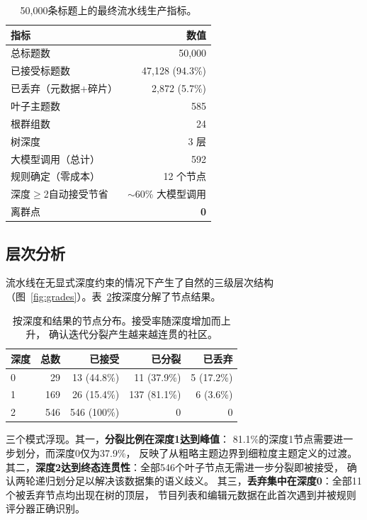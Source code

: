 \documentclass[10pt,twocolumn,twoside]{ctexart}
\begin{document}
\begin{table}[h]
\centering
\caption{50,000条标题上的最终流水线生产指标。}
\label{tab:production}
\small
\begin{tabular}{lr}
\toprule
指标 & 数值 \\
\midrule
总标题数 & 50,000 \\
已接受标题数 & 47,128 (94.3\%) \\
已丢弃（元数据+碎片） & 2,872 (5.7\%) \\
叶子主题数 & 585 \\
根群组数 & 24 \\
树深度 & 3 层 \\
大模型调用（总计） & 592 \\
规则确定（零成本） & 12 个节点 \\
深度$\geq$2自动接受节省 & $\sim$60\% 大模型调用 \\
离群点 & \textbf{0} \\
\bottomrule
\end{tabular}
\end{table}

\subsection{层次分析}
流水线在无显式深度约束的情况下产生了自然的三级层次结构
（图~\ref{fig:grades}）。表~\ref{tab:hierarchy}按深度分解了节点结果。

\begin{table}[h]
\centering
\caption{按深度和结果的节点分布。接受率随深度增加而上升，
确认迭代分裂产生越来越连贯的社区。}
\label{tab:hierarchy}
\small
\begin{tabular}{lrrrr}
\toprule
深度 & 总数 & 已接受 & 已分裂 & 已丢弃 \\
\midrule
0 & 29 & 13 (44.8\%) & 11 (37.9\%) & 5 (17.2\%) \\
1 & 169 & 26 (15.4\%) & 137 (81.1\%) & 6 (3.6\%) \\
2 & 546 & 546 (100\%) & 0 & 0 \\
\bottomrule
\end{tabular}
\end{table}

三个模式浮现。其一，\textbf{分裂比例在深度1达到峰值}：
81.1\%的深度1节点需要进一步划分，而深度0仅为37.9\%，
反映了从粗略主题边界到细粒度主题定义的过渡。
其二，\textbf{深度2达到终态连贯性}：全部546个叶子节点无需进一步分裂即被接受，
确认两轮递归划分足以解决该数据集的语义歧义。
其三，\textbf{丢弃集中在深度0}：全部11个被丢弃节点均出现在树的顶层，
节目列表和编辑元数据在此首次遇到并被规则评分器正确识别。
\end{document}
